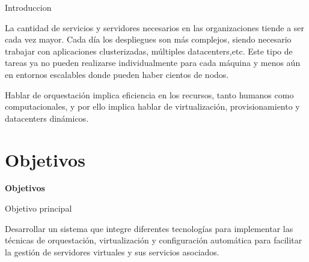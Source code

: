 \documentclass{beamer}
\begin{document}
\begin{frame}{Introduccion}

\vspace{-1.5cm}
La cantidad de servicios y servidores necesarios en las organizaciones tiende a ser cada vez mayor.
Cada día los despliegues son más complejos, siendo necesario trabajar con aplicaciones clusterizadas, múltiples datacenters,etc.
Este tipo de tareas ya no pueden realizarse individualmente para cada máquina y menos aún en entornos escalables donde pueden haber cientos de nodos.

\begin{block}{}
Hablar de orquestación implica eficiencia en los recursos, tanto humanos como computacionales, y por ello implica hablar de virtualización, provisionamiento y datacenters dinámicos.
\end{block}




\end{frame}

\section{Objetivos}


\begin{frame}
    \Huge
    \centering
    \textbf{ Objetivos }

\end{frame}

\begin{frame}{Objetivo principal}

\vspace{-1.5cm}
Desarrollar un sistema que integre diferentes tecnologías para implementar las técnicas de orquestación, virtualización y configuración automática para facilitar la gestión de servidores virtuales y sus servicios asociados.

\end{frame}
\end{document}
